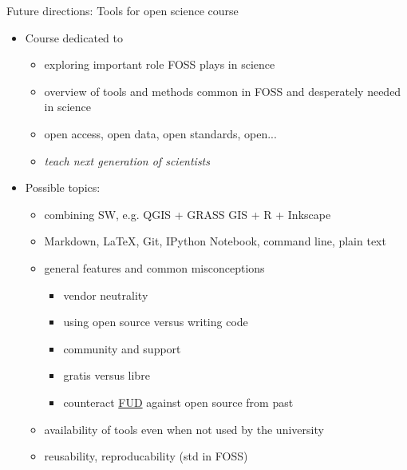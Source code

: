 \documentclass[xcolor={dvipsnames,usenames},beamer]{beamer}
\begin{document}
% 
% 

\begin{frame}{Future directions: Tools for open science course}

\begin{itemize}
 \item Course dedicated to
 \begin{itemize}
  \item exploring important role FOSS plays in science
  \item overview of tools and methods common in FOSS and desperately needed in science
  \item open access, open data, open standards, open...
  \item \emph{teach next generation of scientists}
 \end{itemize}
 \item Possible topics:
 \begin{itemize}

 \item combining SW, e.g. QGIS + GRASS GIS + R + Inkscape
 \item Markdown, \LaTeX, Git, IPython Notebook, command line, plain text

 \item general features and common misconceptions
 \begin{itemize}
  \item vendor neutrality
  \item using open source versus writing code
  \item community and support
  \item gratis versus libre
  \item counteract \href{https://en.wikipedia.org/wiki/Fear,_uncertainty_and_doubt}{FUD}
    against open source from past
 \end{itemize}
 \item availability of tools even when not used by the university
 \item reusability, reproducability (std in FOSS)

\end{itemize}

\end{itemize}

\end{frame}
\end{document}
